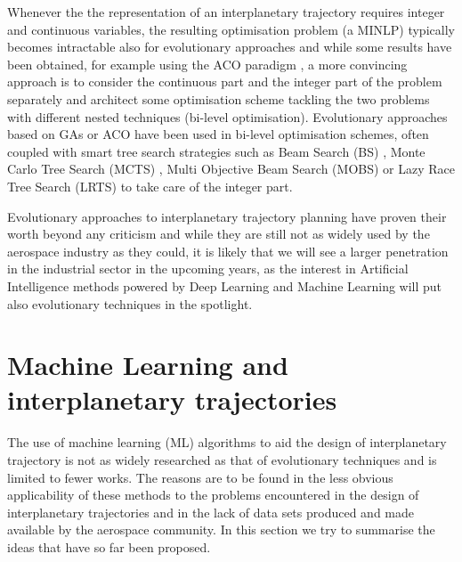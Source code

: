 \documentclass[graybox]{svmult}
\begin{document}
Whenever the the representation of an interplanetary trajectory requires integer and continuous variables, the resulting optimisation problem (a MINLP) typically becomes intractable also for evolutionary approaches and while some results have been obtained, for example using the ACO paradigm \cite{schlueter2013midaco, ceriotti2010mga}, a more convincing approach is to consider the continuous part and the integer part of the problem separately and architect some optimisation scheme tackling the two problems with different nested techniques (bi-level optimisation). Evolutionary approaches based on GAs \cite{izzo2015evolving, izzo2014gtoc5, englander2013automated} or ACO \cite{simoes2017multi} have been used in bi-level optimisation schemes, often coupled with smart tree search strategies such as Beam Search (BS) \cite{grigoriev2013choosing, simoes2017multi}, Monte Carlo Tree Search (MCTS) \cite{hennes2015interplanetary}, Multi Objective Beam Search (MOBS) \cite{izzo2016designing} or Lazy Race Tree Search (LRTS) \cite{izzo2013search} to take care of the integer part.

Evolutionary approaches to interplanetary trajectory planning have proven their worth beyond any criticism and while they are still not as widely used by the aerospace industry as they could, it is likely that we will see a larger penetration in the industrial sector in the upcoming years, as the interest in Artificial Intelligence methods powered by Deep Learning and Machine Learning will put also evolutionary techniques in the spotlight.


\section{Machine Learning and interplanetary trajectories}
\label{sec:3}
The use of machine learning (ML) algorithms to aid the design of interplanetary trajectory is not as widely researched as that of evolutionary techniques and is limited to fewer works. The reasons are to be found in the less obvious applicability of these methods to the problems encountered in the design of interplanetary trajectories and in the lack of data sets produced and made available by the aerospace community. In this section we try to summarise the ideas that have so far been proposed.
\end{document}
